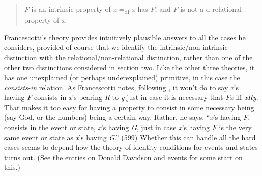 \begin{quote}
\textit{F} is an intrinsic property of \textit{x} =\textsubscript{df} \textit{x} has \textit{F}, and \textit{F} is not a d-relational property of \textit{x}.
\end{quote}

\noindent Francescotti's theory provides intuitively plausible answers to all the cases he considers, provided of course that we identify the intrinsic/non-intrinsic distinction with the relational/non-relational distinction, rather than one of the other two distinctions considered in section two. Like the other three theories, it has one unexplained (or perhaps underexplained) primitive, in this case the \textit{consists-in} relation. As Francescotti notes, following \citet{Khamara1988}, it won't do to say \textit{x}'s having \textit{F} consists in \textit{x}'s bearing \textit{R} to \textit{y} just in case it is necessary that \textit{Fx} iff \textit{xRy}. That makes it too easy for having a property to consist in some necessary being (say God, or the numbers) being a certain way. Rather, he says, ``\textit{x}'s having \textit{F}, consists in the event or state, \textit{x}'s having \textit{G}, just in case \textit{x}'s having \textit{F} is the very same event or state as \textit{x}'s having \textit{G}.'' (599) Whether this can handle all the hard cases seems to depend how the theory of identity conditions for events and states turns out. (See the entries on Donald Davidson and events for some start on this.)
